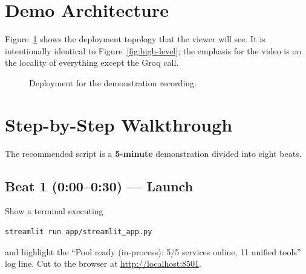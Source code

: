 \section{Demo Architecture}
\label{sec:demo-arch}

Figure~\ref{fig:demo-arch} shows the deployment topology that the
viewer will see. It is intentionally identical to
Figure~\ref{fig:high-level}; the emphasis for the video is on the
locality of everything except the Groq call.

\begin{figure}[H]
\centering
{}
\caption{Deployment for the demonstration recording.}
\label{fig:demo-arch}
\end{figure}

\section{Step-by-Step Walkthrough}
\label{sec:walkthrough}

The recommended script is a \textbf{5-minute} demonstration divided
into eight beats.

\subsection*{Beat 1 (0:00--0:30) --- Launch}
Show a terminal executing
\begin{lstlisting}[style=alBash, numbers=none]
streamlit run app/streamlit_app.py
\end{lstlisting}
and highlight the ``Pool ready (in-process): 5/5 services online, 11
unified tools'' log line. Cut to the browser at
\url{http://localhost:8501}.

